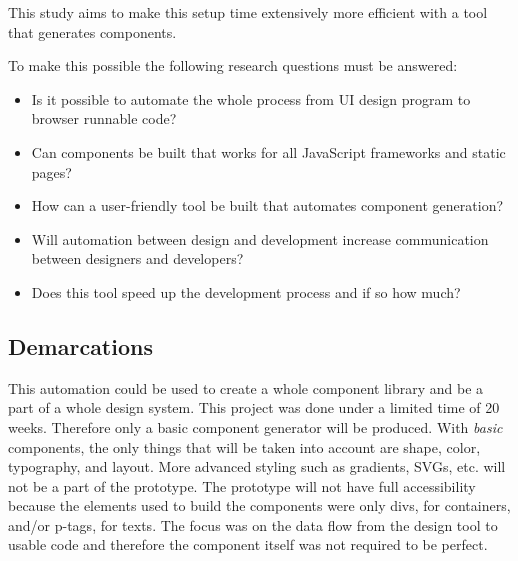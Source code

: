 This study aims to make this setup time extensively more efficient with a tool that generates components. 

To make this possible the following research questions must be answered:
\begin{itemize}
  \item Is it possible to automate the whole process from UI design program to browser runnable code? 
 \item Can components be built that works for all JavaScript frameworks and static pages?
  \item How can a user-friendly tool be built that automates component generation?  
  \item Will automation between design and development increase communication between designers and developers?
  \item Does this tool speed up the development process and if so how much?
\end{itemize}


\subsection{Demarcations}%
\label{sub:Demarcations}
This automation could be used to create a whole component library and be a part of a whole design system. This project was done under a limited time of 20 weeks. Therefore only a basic component generator will be produced. With \textit{basic} components, the only things that will be taken into account are shape, color, typography, and layout. More advanced styling such as gradients, SVGs, etc. will not be a part of the prototype. The prototype will not have full accessibility because  the elements used to build the components were only divs, for containers, and/or p-tags, for texts.
The focus was on the data flow from the design tool to usable code and therefore the component itself was not required to be perfect. 



